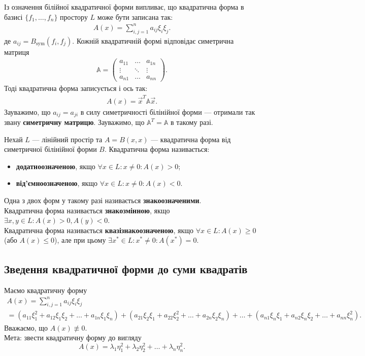 \documentclass{math_library}
\begin{document}
\noindent
Із означення білійної квадратичної форми випливає, що квадратична форма в базисі $\{f_1,\dots,f_n\}$ простору $L$ може бути записана так:
\begin{align*}
A(x) = \displaystyle\sum_{i,j=1}^n a_{ij} \xi_i \xi_j.
\end{align*}
де $a_{ij} = B_{\text{sym}}(f_i,f_j)$. Кожній квадратичній формі відповідає симетрична матриця
\begin{align*}
\mathbb{A} = \begin{pmatrix}
a_{11} & \dots & a_{1n} \\
\vdots & \ddots & \vdots \\
a_{n1} & \dots & a_{nn}
\end{pmatrix}.
\end{align*}
Тоді квадратична форма записується і ось так:
\begin{align*}
A(x) = \vec{x}^T \mathbb{A} \vec{x}.
\end{align*}
\noindent
Зауважимо, що $a_{ij} = a_{ji}$ в силу симетричності білінійної форми --- отримали так звану \textbf{симетричну матрицю}. Зауважимо, що $\mathbb{A}^T = \mathbb{A}$ в такому разі.

\begin{definition}
Нехай $L$ --- лінійний простір та $A = B(x,x)$ --- квадратична форма від симетричної білінійної форми $B$. Квадратична форма називається:
\begin{itemize}[wide=0pt,nosep]
\item \textbf{додатноозначеною}, якщо $\forall x \in L: x \neq 0: A(x) > 0$;
\item \textbf{від'ємноозначеною}, якщо $\forall x \in L: x \neq 0: A(x) < 0$.
\end{itemize}
Одна з двох форм у такому разі називається \textbf{знакоозначеними}.
\bigskip \\
Квадратична форма називається \textbf{знакозмінною}, якщо $\exists x,y \in L: A(x) >0, A(y) < 0$.\\
Квадратична форма називається \textbf{квазізнакоозначеною}, якщо $\forall x \in L: A(x) \geq 0$ (або $A(x) \leq 0$), але при цьому $\exists x^* \in L: x^* \neq 0: A(x^*) = 0$.
\end{definition}

\subsection{Зведення квадратичної форми до суми квадратів}
Маємо квадратичну форму
\begin{align*}
A(x) = \displaystyle\sum_{i,j=1}^n a_{ij} \xi_i \xi_j \\ = (a_{11}\xi_1^2 + a_{12}\xi_1\xi_2 + \dots + a_{1n}\xi_1 \xi_n) + (a_{21}\xi_2\xi_1 + a_{22}\xi_2^2 + \dots + a_{2n}\xi_2 \xi_n) + \dots + (a_{n1}\xi_n \xi_1 + a_{n2}\xi_n\xi_2 + \dots + a_{nn}\xi_n^2).
\end{align*}
Вважаємо, що $A(x) \not\equiv 0$. \\
Мета: звести квадратичну форму до вигляду 
\[
A(x) = \lambda_1 \eta_1^2 + \lambda_2 \eta_2^2 + \dots + \lambda_n \eta_n^2.
\]
\end{document}
